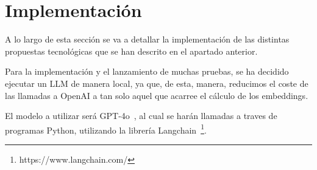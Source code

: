 \section{Implementación}
A lo largo de esta sección se va a detallar la implementación de las distintas propuestas tecnológicas que se han descrito en el apartado anterior.

Para la implementación y el lanzamiento de muchas pruebas, se ha decidido ejecutar un LLM de manera local, ya que, de esta, manera, reducimos el coste de las llamadas a OpenAI a tan solo aquel que acarree el cálculo de los embeddings.

El modelo a utilizar será GPT-4o~\cite{gpt4o}, al cual se harán llamadas a traves de programas Python, utilizando la librería Langchain~\footnote{https://www.langchain.com/}.


